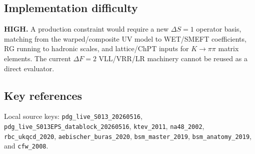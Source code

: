 \subsection*{Implementation difficulty}
\textbf{HIGH.}  A production constraint would require a new \(\Delta S=1\)
operator basis, matching from the warped/composite UV model to WET/SMEFT
coefficients, RG running to hadronic scales, and lattice/ChPT inputs for
\(K\to\pi\pi\) matrix elements.  The current \(\Delta F=2\) VLL/VRR/LR
machinery cannot be reused as a direct evaluator.

\subsection*{Key references}
Local source keys: \texttt{pdg\_live\_S013\_20260516},
\texttt{pdg\_live\_S013EPS\_datablock\_20260516}, \texttt{ktev\_2011},
\texttt{na48\_2002}, \texttt{rbc\_ukqcd\_2020},
\texttt{aebischer\_buras\_2020}, \texttt{bsm\_master\_2019},
\texttt{bsm\_anatomy\_2019}, and \texttt{cfw\_2008}.
